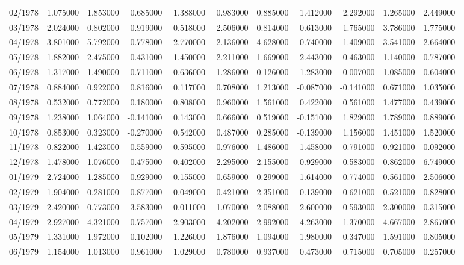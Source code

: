 \begin{tabular}{lrrrrrrrrrr}
02/1978 & 1.075000 & 1.853000 & 0.685000 & 1.388000 & 0.983000 & 0.885000 & 1.412000 & 2.292000 & 1.265000 & 2.449000 \\
03/1978 & 2.024000 & 0.802000 & 0.919000 & 0.518000 & 2.506000 & 0.814000 & 0.613000 & 1.765000 & 3.786000 & 1.775000 \\
04/1978 & 3.801000 & 5.792000 & 0.778000 & 2.770000 & 2.136000 & 4.628000 & 0.740000 & 1.409000 & 3.541000 & 2.664000 \\
05/1978 & 1.882000 & 2.475000 & 0.431000 & 1.450000 & 2.211000 & 1.669000 & 2.443000 & 0.463000 & 1.140000 & 0.787000 \\
06/1978 & 1.317000 & 1.490000 & 0.711000 & 0.636000 & 1.286000 & 0.126000 & 1.283000 & 0.007000 & 1.085000 & 0.604000 \\
07/1978 & 0.884000 & 0.922000 & 0.816000 & 0.117000 & 0.708000 & 1.213000 & -0.087000 & -0.141000 & 0.671000 & 1.035000 \\
08/1978 & 0.532000 & 0.772000 & 0.180000 & 0.808000 & 0.960000 & 1.561000 & 0.422000 & 0.561000 & 1.477000 & 0.439000 \\
09/1978 & 1.238000 & 1.064000 & -0.141000 & 0.143000 & 0.666000 & 0.519000 & -0.151000 & 1.829000 & 1.789000 & 0.889000 \\
10/1978 & 0.853000 & 0.323000 & -0.270000 & 0.542000 & 0.487000 & 0.285000 & -0.139000 & 1.156000 & 1.451000 & 1.520000 \\
11/1978 & 0.822000 & 1.423000 & -0.559000 & 0.595000 & 0.976000 & 1.486000 & 1.458000 & 0.791000 & 0.921000 & 0.092000 \\
12/1978 & 1.478000 & 1.076000 & -0.475000 & 0.402000 & 2.295000 & 2.155000 & 0.929000 & 0.583000 & 0.862000 & 6.749000 \\
01/1979 & 2.724000 & 1.285000 & 0.929000 & 0.155000 & 0.659000 & 0.299000 & 1.614000 & 0.774000 & 0.561000 & 2.506000 \\
02/1979 & 1.904000 & 0.281000 & 0.877000 & -0.049000 & -0.421000 & 2.351000 & -0.139000 & 0.621000 & 0.521000 & 0.828000 \\
03/1979 & 2.420000 & 0.773000 & 3.583000 & -0.011000 & 1.070000 & 2.088000 & 2.600000 & 0.593000 & 2.300000 & 0.315000 \\
04/1979 & 2.927000 & 4.321000 & 0.757000 & 2.903000 & 4.202000 & 2.992000 & 4.263000 & 1.370000 & 4.667000 & 2.867000 \\
05/1979 & 1.331000 & 1.972000 & 0.102000 & 1.226000 & 1.876000 & 1.094000 & 1.980000 & 0.347000 & 1.591000 & 0.805000 \\
06/1979 & 1.154000 & 1.013000 & 0.961000 & 1.029000 & 0.780000 & 0.937000 & 0.473000 & 0.715000 & 0.705000 & 0.257000 \\

\end{tabular}
